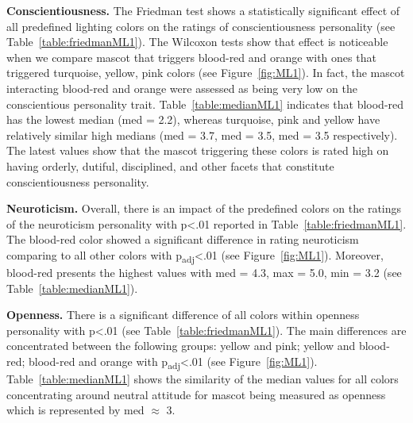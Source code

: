 \par\textbf{Conscientiousness.}
The Friedman test shows a statistically significant effect of all predefined lighting colors
on the ratings of conscientiousness personality (see Table~\ref{table:friedmanML1}).
The Wilcoxon tests show that effect is noticeable when we compare mascot that triggers
blood-red and orange with ones that triggered turquoise, yellow, pink colors (see Figure~\ref{fig:ML1}).
In fact, the mascot interacting blood-red and orange were assessed
as being very low on the conscientious personality trait.
Table~\ref{table:medianML1} indicates that blood-red has the lowest median (med = 2.2), whereas turquoise, pink and
yellow have relatively similar high medians (med = 3.7, med = 3.5, med = 3.5 respectively).
The latest values show that the mascot triggering these colors is rated high on having
orderly, dutiful, disciplined, and other facets that constitute conscientiousness personality.

\par\textbf{Neuroticism.}
Overall, there is an impact of the predefined colors on the ratings of the neuroticism
personality with p<.01 reported in Table~\ref{table:friedmanML1}.
The blood-red color showed a significant difference in rating neuroticism comparing
to all other colors with p\textsubscript{adj}<.01 (see Figure~\ref{fig:ML1}).
Moreover, blood-red presents the highest values with med = 4.3, max = 5.0, min = 3.2 (see Table~\ref{table:medianML1}).

\par\textbf{Openness.}
There is a significant difference of all colors within openness personality
with p<.01 (see Table~\ref{table:friedmanML1}).
The main differences are concentrated between the following groups: yellow and pink;
yellow and blood-red;
blood-red and orange with p\textsubscript{adj}<.01 (see Figure~\ref{fig:ML1}).
Table~\ref{table:medianML1} shows the similarity of the median values for all colors concentrating around neutral attitude for mascot
being measured as openness which is represented by med $\approx$ 3.

